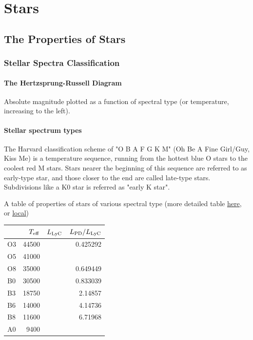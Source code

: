 
\chapter{Stars}
\minitoc

\setlength\parindent{15pt}  

\section{The Properties of Stars}

\subsection{Stellar Spectra Classification}
\subsubsection{The Hertzsprung-Russell Diagram}
Absolute magnitude plotted as a function of spectral type (or temperature, increasing to the left).

\subsubsection{Stellar spectrum types}


The Harvard classification scheme of "O B A F G K M" (Oh Be A Fine Girl/Guy, Kiss Me) is a temperature sequence, running from the hottest blue O stars to the coolest red M stars. Stars nearer the beginning of this sequence are referred to as early-type star, and those closer to the end are called late-type stars. Subdivisions like a K0 star is referred as "early K star".

A table of properties of stars of various spectral type (more detailed table \href{https://sites.uni.edu/morgans/astro/course/Notes/section2/spectralmasses.html}{here}, or \href{file:///Users/chongchonghe/Academics/online-documents/20220809-09:52:21-Spectral Types.html}{local})

\begin{center}
  \begin{tabular}{lrlr}
	& \(T_{\rm eff}\) & \(L_{\rm LyC}\) & \(L_{\rm PD}/L_{\rm LyC}\)\\
	\hline
	O3 & 44500 &  & 0.425292\\
	O5 & 41000 &  & \\
	O8 & 35000 &  & 0.649449\\
	B0 & 30500 &  & 0.833039\\
	B3 & 18750 &  & 2.14857\\
	B6 & 14000 &  & 4.14736\\
	B8 & 11600 &  & 6.71968\\
	A0 & 9400 &  & \\
  \end{tabular}
\end{center}

